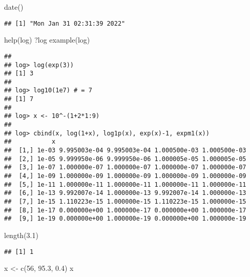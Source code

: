 \documentclass[
]{article}
\newenvironment{Shaded}{\begin{snugshade}}{\end{snugshade}}
\newcommand{\DecValTok}[1]{\textcolor[rgb]{0.00,0.00,0.81}{#1}}
\newcommand{\FloatTok}[1]{\textcolor[rgb]{0.00,0.00,0.81}{#1}}
\newcommand{\FunctionTok}[1]{\textcolor[rgb]{0.00,0.00,0.00}{#1}}
\newcommand{\NormalTok}[1]{#1}
\newcommand{\OtherTok}[1]{\textcolor[rgb]{0.56,0.35,0.01}{#1}}
\begin{document}
\begin{Shaded}
\begin{Highlighting}[]
\FunctionTok{date}\NormalTok{()}
\end{Highlighting}
\end{Shaded}

\begin{verbatim}
## [1] "Mon Jan 31 02:31:39 2022"
\end{verbatim}

\begin{Shaded}
\begin{Highlighting}[]
\FunctionTok{help}\NormalTok{(log)}
\NormalTok{?log}
\FunctionTok{example}\NormalTok{(log)}
\end{Highlighting}
\end{Shaded}

\begin{verbatim}
## 
## log> log(exp(3))
## [1] 3
## 
## log> log10(1e7) # = 7
## [1] 7
## 
## log> x <- 10^-(1+2*1:9)
## 
## log> cbind(x, log(1+x), log1p(x), exp(x)-1, expm1(x))
##           x                                                    
##  [1,] 1e-03 9.995003e-04 9.995003e-04 1.000500e-03 1.000500e-03
##  [2,] 1e-05 9.999950e-06 9.999950e-06 1.000005e-05 1.000005e-05
##  [3,] 1e-07 1.000000e-07 1.000000e-07 1.000000e-07 1.000000e-07
##  [4,] 1e-09 1.000000e-09 1.000000e-09 1.000000e-09 1.000000e-09
##  [5,] 1e-11 1.000000e-11 1.000000e-11 1.000000e-11 1.000000e-11
##  [6,] 1e-13 9.992007e-14 1.000000e-13 9.992007e-14 1.000000e-13
##  [7,] 1e-15 1.110223e-15 1.000000e-15 1.110223e-15 1.000000e-15
##  [8,] 1e-17 0.000000e+00 1.000000e-17 0.000000e+00 1.000000e-17
##  [9,] 1e-19 0.000000e+00 1.000000e-19 0.000000e+00 1.000000e-19
\end{verbatim}

\begin{Shaded}
\begin{Highlighting}[]
\FunctionTok{length}\NormalTok{(}\FloatTok{3.1}\NormalTok{)}
\end{Highlighting}
\end{Shaded}

\begin{verbatim}
## [1] 1
\end{verbatim}

\begin{Shaded}
\begin{Highlighting}[]
\NormalTok{x }\OtherTok{\textless{}{-}} \FunctionTok{c}\NormalTok{(}\DecValTok{56}\NormalTok{, }\FloatTok{95.3}\NormalTok{, }\FloatTok{0.4}\NormalTok{)}
\NormalTok{x}
\end{Highlighting}
\end{Shaded}
\end{document}
